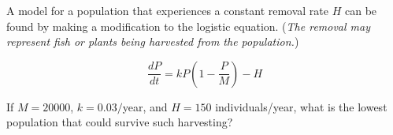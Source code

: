 \documentclass[11pt]{article}
\begin{document}
\pagebreak

A model for a population that experiences a constant removal rate $H$ can be found by making a modification to the logistic equation.  (\emph{The removal
	may represent fish or plants being harvested from the population.}) 

\begin{displaymath}
\frac{dP}{dt} = kP\left(1-\frac{P}{M} \right) - H
\end{displaymath}


\vspace{5in}
If $M=20000$, $k=0.03/$year, and $H = 150$ individuals/year, what is the lowest population that could survive such harvesting?
%
%
%
%
%
%
%
%
%
%
%
%
%
%
\end{document}
